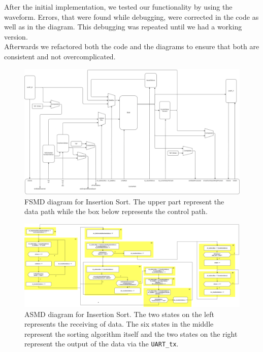 \documentclass[conference]{IEEEtran}
\begin{document}
After the initial implementation, we tested our functionality by using the waveform. Errors, that were found while debugging, were corrected in the code as well as in the diagram. This debugging was repeated until we had a working version.\\
Afterwards we refactored both the code and the diagrams to ensure that both are consistent and not overcomplicated. 
\begin{figure}
    \centering
    \includegraphics[width=1\linewidth]{Images/FSMDInsertionSort.png}
    \caption{FSMD diagram for Insertion Sort. The upper part represent the data path while the box below represents the control path.}
    \label{fig:fsmd}
\end{figure}
\begin{figure}
    \centering
    \includegraphics[width=1\linewidth]{Images/ASMDInsertionSort.png}
    \caption{ASMD diagram for Insertion Sort. The two states on the left represents the receiving of data. The six states in the middle represent the sorting algorithm itself and the two states on the right represent the output of the data via the \texttt{UART\_tx}.}
    \label{fig:asmd}
\end{figure}
\end{document}
